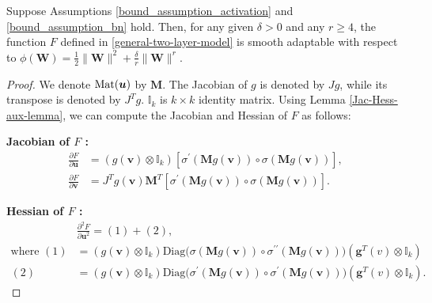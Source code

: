 \documentclass[twoside,11pt]{article}
\newcommand{\be}{\begin{equation}}
\newcommand{\ee}{\end{equation}}
\def\Mat{{\rm Mat}}
\def\vg{{\bm{g}}}
\def\vu{{\bm{u}}}
\def\vv{{\bm{v}}}
\def\mM{{\bm{M}}}
\def\mW{{\bm{W}}}
\begin{document}
\begin{proposition}
Suppose Assumptions \ref{bound_assumption_activation} and \ref{bound_assumption_bn} hold. Then, for any given $\delta>0$ and any $r\geq4$, the function $F$ defined in \eqref{general-two-layer-model} is smooth adaptable with respect to $\phi(\mW)=\frac{1}{2}\|\mW\|^2+\frac{\delta}{r}\|\mW\|^r$.
\label{DNN-kernel-degree-prop}
\end{proposition}
\begin{proof}
We denote $\Mat(\vu)$ by $\mM$. The Jacobian of $g$ is denoted by $Jg$, while its transpose is denoted by $J^Tg$. $\mathbb{I}_k$ is $k\times k$ identity matrix. Using Lemma \ref{Jac-Hess-aux-lemma}, we can compute the Jacobian and Hessian of $F$ as follows:

{\noindent\bf Jacobian of $F$ :}\\
\be 
\begin{aligned}
\frac{\partial F}{\partial\vu}&=\left(g(\vv)\otimes\mathbb I_k\right)\left[\sigma^\prime(\mM g(\vv))\circ\sigma(\mM g(\vv))\right],\\
\frac{\partial F}{\partial\vv}&=J^Tg(\vv)\mM^T\left[\sigma^\prime(\mM g(\vv))\circ\sigma(\mM g(\vv))\right].
\end{aligned}
\label{Jacobian_F}
\ee 

{\noindent\bf Hessian of $F$ :}\\
\be 
\begin{aligned}
&\frac{\partial^2F}{\partial\vu^2}=(1)+(2),\\
\text{where }(1)&=\left(g(\vv)\otimes\mathbb I_k\right)\text{Diag}\big(\sigma(\mM g(\vv))\circ\sigma^{\prime\prime}(\mM g(\vv))\big)(\vg^T(v)\otimes\mathbb I_k)\\
(2)&=\left(g(\vv)\otimes\mathbb I_k\right)\text{Diag}\big(\sigma^\prime(\mM g(\vv))\circ\sigma^{\prime}(\mM g(\vv))\big)(\vg^T(v)\otimes\mathbb I_k).
\end{aligned}
\label{Hessian_Fuu}
\ee 


\end{proof}
\end{document}

